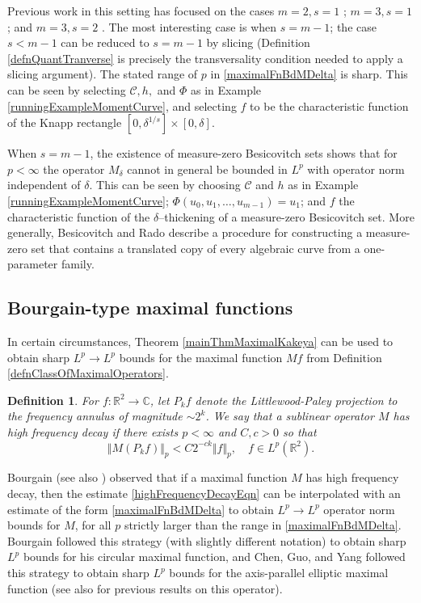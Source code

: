 \documentclass[letterpaper, reqno,11pt]{article}
\numberwithin{equation}{section}
\newcommand{\RR}{\mathbb{R}}
\newcommand{\CC}{\mathbb{C}}
\numberwithin{thm}{section}
\newtheorem{defn}[thm]{Definition}
\theoremstyle{remark}
\begin{document}
Previous work in this setting has focused on the cases $m=2,s=1$ \cite{cordoba}; $m=3,s=1$ \cite{Stein, Bour2}; and $m=3,s=2$ \cite{KolasaWolff, PYZ, WolffKakeyacircles, Zahl2012b, Zahl2012}. The most interesting case is when $s=m-1$; the case $s<m-1$ can be reduced to $s=m-1$ by slicing (Definition \ref{defnQuantTranverse} is precisely the transversality condition needed to apply a slicing argument). The stated range of $p$ in \eqref{maximalFnBdMDelta} is sharp. This can be seen by selecting $\mathcal{C},h,$ and $\Phi$ as in Example \ref{runningExampleMomentCurve}, and selecting $f$ to be the characteristic function of the Knapp rectangle $[0, \delta^{1/s}]\times[0,\delta]$.

When $s=m-1$, the existence of measure-zero Besicovitch sets shows that for $p<\infty$ the operator $M_\delta$ cannot in general be bounded in $L^p$ with operator norm independent of $\delta$. This can be seen by choosing $\mathcal{C}$ and $h$ as in Example \ref{runningExampleMomentCurve}; $\Phi(u_0,u_1,\ldots,u_{m-1}) = u_1$; and $f$ the characteristic function of the $\delta$--thickening of a measure-zero Besicovitch set. More generally, Besicovitch and Rado \cite{BesRad} describe a procedure for constructing a measure-zero set that contains a translated copy of every algebraic curve from a one-parameter family.

\subsection{Bourgain-type maximal functions}\label{bourgainIntroSection}
In certain circumstances, Theorem \ref{mainThmMaximalKakeya} can be used to obtain sharp $L^p\to L^p$ bounds for the maximal function $Mf$ from Definition \ref{defnClassOfMaximalOperators}.
\begin{defn}\label{highFrequencyDecayCondition}
For $f\colon\RR^2\to\CC$, let $P_kf$ denote the Littlewood-Paley projection to the frequency annulus of magnitude $\sim 2^k$. We say that a sublinear operator $M$ has \emph{high frequency decay} if there exists $p<\infty$ and $C,c>0$ so that
\begin{equation}\label{highFrequencyDecayEqn}
\Vert M (P_k f)\Vert_p < C 2^{-ck}\Vert f\Vert_p,\quad f\in L^p(\RR^2).
\end{equation}
\end{defn}
Bourgain \cite{Bour2} (see also \cite{Sogge}) observed that if a maximal function $M$ has high frequency decay, then the estimate \eqref{highFrequencyDecayEqn} can be interpolated with an estimate of the form \eqref{maximalFnBdMDelta} to obtain $L^p\to L^p$ operator norm bounds for $M$, for all $p$ strictly larger than the range in \eqref{maximalFnBdMDelta}. Bourgain \cite{Bour2} followed this strategy (with slightly different notation) to obtain sharp $L^p$ bounds for his circular maximal function, and Chen, Guo, and Yang \cite{CGYv2} followed this strategy to obtain sharp $L^p$ bounds for the axis-parallel elliptic maximal function (see also \cite{LLO} for previous results on this operator).
\end{document}
